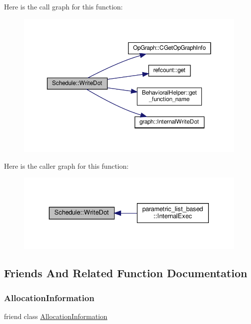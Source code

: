 Here is the call graph for this function\+:
\nopagebreak
\begin{figure}[H]
\begin{center}
\leavevmode
\includegraphics[width=350pt]{df/d61/classSchedule_af0fedbcf697272b4f295bf0e7ef3a358_cgraph}
\end{center}
\end{figure}
Here is the caller graph for this function\+:
\nopagebreak
\begin{figure}[H]
\begin{center}
\leavevmode
\includegraphics[width=330pt]{df/d61/classSchedule_af0fedbcf697272b4f295bf0e7ef3a358_icgraph}
\end{center}
\end{figure}


\subsection{Friends And Related Function Documentation}
\mbox{\label{classSchedule_a995b99fd9889f07eef755c6b9fe70c3f}} 
\subsubsection{\texorpdfstring{Allocation\+Information}{AllocationInformation}}
{\footnotesize\ttfamily friend class \hyperlink{classAllocationInformation}{Allocation\+Information}\hspace{0.3cm}{\ttfamily [friend]}}



